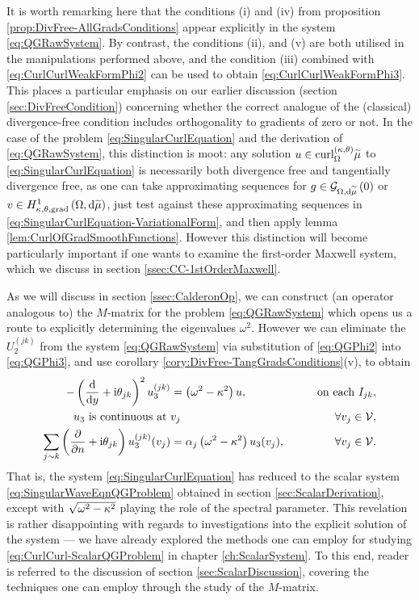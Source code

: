 It is worth remarking here that the conditions (i) and (iv) from proposition \ref{prop:DivFree-AllGradsConditions} appear explicitly in the system \eqref{eq:QGRawSystem}.
By contrast, the conditions (ii), and (v) are both utilised in the manipulations performed above, and the condition (iii) combined with \eqref{eq:CurlCurlWeakFormPhi2} can be used to obtain \eqref{eq:CurlCurlWeakFormPhi3}.
This places a particular emphasis on our earlier discussion (section \ref{sec:DivFreeCondition}) concerning whether the correct analogue of the (classical) divergence-free condition includes orthogonality to gradients of zero or not.
In the case of the problem \eqref{eq:SingularCurlEquation} and the derivation of \eqref{eq:QGRawSystem}, this distinction is moot: any solution $u\in\mathrm{curl}_{\Omega}^{\left( \kappa, \theta \right)}{\widetilde{\mu}}$ to \eqref{eq:SingularCurlEquation} is necessarily both divergence free and tangentially divergence free, as one can take approximating sequences for $g\in\mathcal{G}_{ \Omega, \mathrm{d}\widetilde{\mu}}\left( 0 \right)$ or $v\in H^1_{\kappa,\theta,\mathrm{grad}}\left( \Omega, \mathrm{d}\widetilde{\mu} \right)$, just test against these approximating sequences in \eqref{eq:SingularCurlEquation-VariationalForm}, and then apply lemma \ref{lem:CurlOfGradSmoothFunctions}.
However this distinction will become particularly important if one wants to examine the first-order Maxwell system, which we discuss in section \ref{ssec:CC-1stOrderMaxwell}.

As we will discuss in section \ref{ssec:CalderonOp}, we can construct (an operator analogous to) the $M$-matrix for the problem \eqref{eq:QGRawSystem} which opens us a route to explicitly determining the eigenvalues $\omega^2$.
However we can eliminate the $U_2^{(jk)}$ from the system \eqref{eq:QGRawSystem} via substitution of \eqref{eq:QGPhi2} into \eqref{eq:QGPhi3}, and use corollary \ref{cory:DivFree-TangGradsConditions}(v), to obtain
\begin{subequations} \label{eq:CurlCurl-ScalarQGProblem}
	\begin{align}
		-\left(  \dfrac{\mathrm{d}}{\mathrm{d}y} + \mathrm{i}\theta_{jk}  \right)^2 u_3^{(jk)} &= \left( \omega^2-\kappa^2 \right)u,
		\qquad &\text{on each } I_{jk}, \\
		u_3 \text{ is continuous at } & v_j \qquad &\forall v_j\in\mathcal{V}, \\
		\sum_{j\sim k}\left( \dfrac{\partial }{\partial n}+\mathrm{i}\theta_{jk} \right)u_3^{(jk)}(v_j) &= \alpha_j\left( \omega^2-\kappa^2 \right)u_3(v_j), \qquad &\forall v_j\in\mathcal{V}.
	\end{align}
\end{subequations}
That is, the system \eqref{eq:SingularCurlEquation} has reduced to the scalar system \eqref{eq:SingularWaveEqnQGProblem} obtained in section \ref{sec:ScalarDerivation}, except with $\sqrt{\omega^2-\kappa^2}$ playing the role of the spectral parameter.
This revelation is rather disappointing with regards to investigations into the explicit solution of the system --- we have already explored the methods one can employ for studying \eqref{eq:CurlCurl-ScalarQGProblem} in chapter \ref{ch:ScalarSystem}.
To this end, reader is referred to the discussion of section \ref{sec:ScalarDiscussion}, covering the techniques one can employ through the study of the $M$-matrix.

